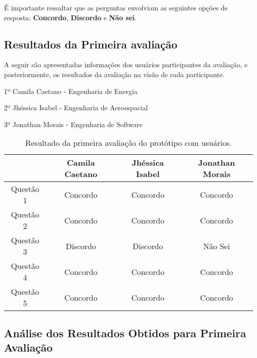 			É importante ressaltar que as perguntas envolviam as seguintes opções de resposta: \textbf{Concordo}, \textbf{Discordo} e \textbf{Não sei}.

		\subsection[Resultados da Primeira Avaliação]{Resultados da Primeira avaliação}
		\label{sec:primeiraAvaliacao_Resultados}

			A seguir são apresentadas informações dos usuários participantes da avaliação, e posteriormente, os resultados da avaliação na visão de cada participante.

			1º Camila Caetano - Engenharia de Energia

			2º Jhéssica Isabel - Engenharia de Aeroespacial

			3º Jonathan Morais - Engenharia de Software

			\begin{table}[h]
				\centering 
				\begin{tabular}{|c|c|c|c|}

					\hline

					& Camila Caetano & Jhéssica Isabel & Jonathan Morais \\
					
					\hline
					
					Questão 1 & Concordo & Concordo & Concordo \\
					
					Questão 2 & Concordo & Concordo & Concordo \\
					
					Questão 3 & Discordo & Discordo & Não Sei \\

					Questão 4 & Concordo & Concordo & Concordo \\

					Questão 5 & Concordo & Concordo & Concordo \\

					\hline

				\end{tabular}
				\caption[Resultado da primeira avaliação do protótipo com usuários]{Resultado da primeira avaliação do protótipo com usuários.}
				\label{tab:primeiraAvaliacao_tables}
			\end{table}

		\subsection[Análise dos Resultados Obtidos para Primeira Avaliação]{Análise dos Resultados Obtidos para Primeira Avaliação}
		\label{sec:primeiraAvaliacao_Analise}

